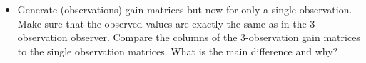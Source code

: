 \begin{itemize}
\item Generate (observations) gain matrices but now for only a single
  observation. Make sure that the observed values are exactly the same as in
  the 3 observation observer. Compare the columns of the 3-observation gain
  matrices to the single observation matrices. What is the main difference and
  why?
\end{itemize}
